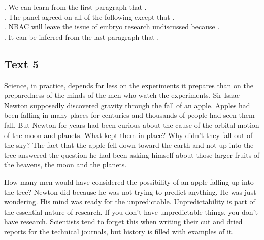 \begin{questions}  .	We can learn from the first paragraph that \ltk{}.\\
 .	The panel agreed on all of the following except that \ltk{}.\\
 .	NBAC will leave the issue of embryo research undiscussed because \ltk{}.\\
 .	It can be inferred from the last paragraph that \ltk{}.\\
\end{questions}   

\subsection{Text 5}
Science, in practice, depends far less on the experiments it prepares than on the preparedness of the minds of the men who watch the experiments. Sir Isaac Newton supposedly discovered gravity through the fall of an apple. Apples had been falling in many places for centuries and thousands of people had seen them fall. But Newton for years had been curious about the cause of the orbital motion of the moon and planets. What kept them in place? Why didn’t they fall out of the sky? The fact that the apple fell down toward the earth and not up into the tree answered the question he had been asking himself about those larger fruits of the heavens, the moon and the planets.

How many men would have considered the possibility of an apple falling up into the tree? Newton did because he was not trying to predict anything. He was just wondering. His mind was ready for the unpredictable. Unpredictability is part of the essential nature of research. If you don’t have unpredictable things, you don’t have research. Scientists tend to forget this when writing their cut and dried reports for the technical journals, but history is filled with examples of it.

